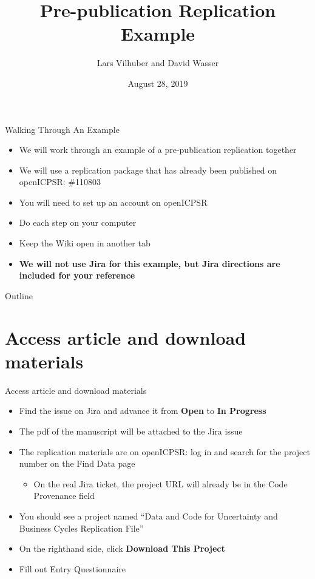 \documentclass[xcolor={dvipsnames}]{beamer}
\title[LDI Training]{Pre-publication Replication Example}
\author{Lars Vilhuber and David Wasser}
\date{August 28, 2019}
\theoremstyle{definition}
\begin{document}
\makeatletter
\def\@listi{\leftmargin\leftmarginii \parsep .2em \itemsep 1em}
\def\@listii{\leftmargin\leftmarginii \topsep .2em \parsep .2em \itemsep .2em}
\makeatother

\begin{frame}[plain]
\titlepage
\addtocounter{framenumber}{-1}
\end{frame}

\begin{frame}{Walking Through An Example}
\begin{itemize}
    \item We will work through an example of a pre-publication replication together
    \item We will use a replication package that has already been published on openICPSR: \#110803
    \item You will need to set up an account on openICPSR
    \item Do each step on your computer
    \item Keep the Wiki open in another tab
    \item \textbf{We will not use Jira for this example, but Jira directions are included for your reference}
\end{itemize}
\end{frame}

\begin{frame}{Outline}
\tableofcontents
\end{frame}

\section{Access article and download materials}

\begin{frame}{Access article and download materials}
\begin{itemize}
    \item Find the issue on Jira and advance it from \textbf{Open} to \textbf{In Progress}
    \item The pdf of the manuscript will be attached to the Jira issue
    \item The replication materials are on openICPSR: log in and search for the project number on the Find Data page
    \begin{itemize}
        \item On the real Jira ticket, the project URL will already be in the Code Provenance field
    \end{itemize}
    \item You should see a project named ``Data and Code for Uncertainty and Business Cycles Replication File''
    \item On the righthand side, click \textbf{Download This Project}
    \item Fill out Entry Questionnaire
\end{itemize}
\end{frame}
\end{document}
